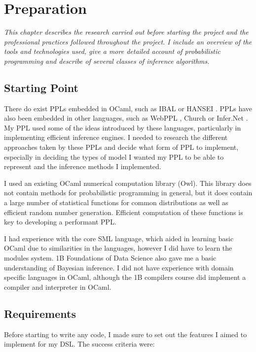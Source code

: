 \chapter{Preparation}

\textit{This chapter describes the research carried out before starting the project and the professional practices followed throughout the project. I include an overview of the tools and technologies used, give a more detailed account of probabilistic programming and describe of several classes of inference algorithms.}

\section{Starting Point}

There do exist PPLs embedded in OCaml, such as IBAL \cite{ibal} or HANSEI \cite{kiselyov2009embedded}. PPLs have also been embedded in other languages, such as WebPPL \cite{mobus2018structure}, Church \cite{goodman2012church} or Infer.Net \cite{wang2011using}. My PPL used some of the ideas introduced by these languages, particularly in implementing efficient inference engines. I needed to research the different approaches taken by these PPLs and decide what form of PPL to implement, especially in deciding the types of model I wanted my PPL to be able to represent and the inference methods I implemented.

I used an existing OCaml numerical computation library (Owl). This library does not contain methods for probabilistic programming in general, but it does contain a large number of statistical functions for common distributions as well as efficient random number generation. Efficient computation of these functions is key to developing a performant PPL. 

I had experience with the core SML language, which aided in learning basic OCaml due to similarities in the languages, however I did have to learn the modules system. 1B Foundations of Data Science also gave me a basic understanding of Bayesian inference. I did not have experience with domain specific languages in OCaml, although the 1B compilers course did implement a compiler and interpreter in OCaml.

\section{Requirements}

Before starting to write any code, I made sure to set out the features I aimed to implement for my DSL. The success criteria were:

